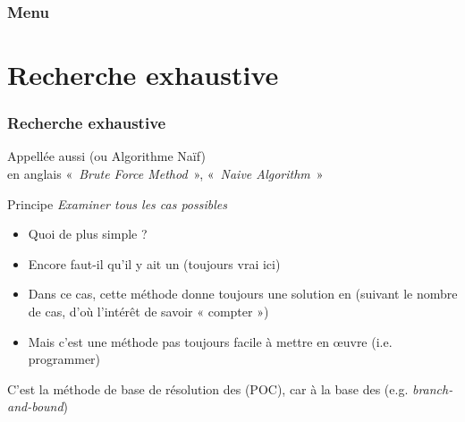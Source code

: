 \documentclass[aspectratio=1610,francais,envcountsect]{beamer}
\begin{document}
\begin{frame}
  \frametitle{Menu}
  \tableofcontents[hidesubsections]
\end{frame}
  

\section{Recherche exhaustive}

\begin{frame}
  \frametitle{Recherche exhaustive}

  Appellée aussi  (ou Algorithme Naïf)\\en
  anglais «~\emph{Brute Force Method}~», «~\emph{Naive Algorithm}~»

  \bigskip
  
  \begin{alertblock}{Principe}
    \emph{Examiner tous les cas possibles}
  \end{alertblock}

  \bigskip
  
  \begin{itemize}
  \item Quoi de plus simple ?
  \item Encore faut-il qu'il y ait un  (toujours vrai ici)
  \item Dans ce cas, cette méthode donne toujours une solution en
     (suivant le nombre de
    cas, d'où l'intérêt de savoir « compter »)
  \item Mais c'est une méthode pas toujours facile à mettre en œuvre
    (i.e. programmer)
  \end{itemize}

  C'est la méthode de base de résolution des  (POC), car à la base des
   (e.g. \emph{branch-and-bound})

\end{frame}
\end{document}
